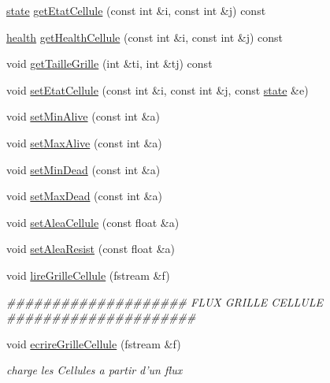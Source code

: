 \begin{DoxyCompactItemize}
\item 
\hyperlink{enum_8h_adc6e5733fc3c22f0a7b2914188c49c90}{state} \hyperlink{classGrilleCellule_ab81f5d91b88eebc8bc102553f6b2f9e6}{getEtatCellule} (const int \&i, const int \&j) const 
\item 
\hyperlink{enum_8h_ae2f10db0fed275ae9f323a3c41243971}{health} \hyperlink{classGrilleCellule_acb1370990fbd3dd64a2bde8df9187199}{getHealthCellule} (const int \&i, const int \&j) const 
\item 
void \hyperlink{classGrilleCellule_a14452abb840f431702ff5bd2526b3240}{getTailleGrille} (int \&ti, int \&tj) const 
\item 
void \hyperlink{classGrilleCellule_a7d308e131cc0085ffb3f1a0edb4abcd5}{setEtatCellule} (const int \&i, const int \&j, const \hyperlink{enum_8h_adc6e5733fc3c22f0a7b2914188c49c90}{state} \&e)
\item 
void \hyperlink{classGrilleCellule_a43ee46595563c36cc989aaa4346d9c2c}{setMinAlive} (const int \&a)
\item 
void \hyperlink{classGrilleCellule_a4f3612362ae067c6451c575c55fcccae}{setMaxAlive} (const int \&a)
\item 
void \hyperlink{classGrilleCellule_ab01e2dfa53ec99c84a5b3991a017abd2}{setMinDead} (const int \&a)
\item 
void \hyperlink{classGrilleCellule_a57706021c3a7ea559334b43e4d1102fc}{setMaxDead} (const int \&a)
\item 
void \hyperlink{classGrilleCellule_aa7b719a2793ea949ae19c03b161d4666}{setAleaCellule} (const float \&a)
\item 
void \hyperlink{classGrilleCellule_a56794fa241d115a5b53c1e3f98fd483f}{setAleaResist} (const float \&a)
\item 
void \hyperlink{classGrilleCellule_a657f3378571595c6663af21255b930a4}{lireGrilleCellule} (fstream \&f)
\begin{DoxyCompactList}\small\item\em \#\#\#\#\#\#\#\#\#\#\#\#\#\#\#\#\#\#\#\# FLUX GRILLE CELLULE \#\#\#\#\#\#\#\#\#\#\#\#\#\#\#\#\#\#\#\#\# \end{DoxyCompactList}\item 
void \hyperlink{classGrilleCellule_a1dede0b4caae7b96d52c900021fe15a4}{ecrireGrilleCellule} (fstream \&f)
\begin{DoxyCompactList}\small\item\em charge les Cellules a partir d'un flux \end{DoxyCompactList}\end{DoxyCompactItemize}
